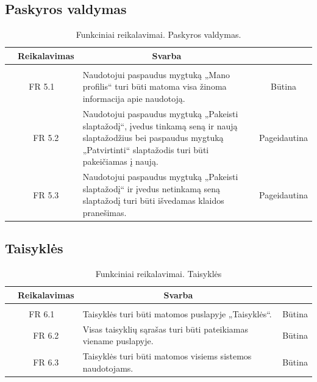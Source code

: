 \documentclass{VUMIFPSkursinis}
\begin{document}
	\subsection{Paskyros valdymas}
	
	\begin{table}[H]
		\caption{Funkciniai reikalavimai. Paskyros valdymas.}
		\begin{tabular}{|p{1cm}|p{1cm}|p{}|p{}|}
			\hline 
			\rowcolor{gray!50}
			\multicolumn{2}{|c|}{{\bfseries Kodas}}&
			\multicolumn{1}{c|}{{\bfseries Reikalavimas}}&
			\multicolumn{1}{c|}{{\bfseries Svarba}}\\
			\hline
			\rowcolor{lightgray}
			\multicolumn{4}{|c|}{Paskyros valdymas}\\				
			\hline
			\multicolumn{2}{|c|}{FR 5.1}&
			{Naudotojui paspaudus mygtuką „Mano profilis“ turi būti matoma visa žinoma informacija apie naudotoją.
			}&		
			\multicolumn{1}{c|}{Būtina}\\
			\hline
			\multicolumn{1}{|c}{}&
			\multicolumn{1}{c|}{FR 5.2}&
			{Naudotojui paspaudus mygtuką „Pakeisti slaptažodį“, įvedus tinkamą seną ir naują slaptažodžius bei paspaudus mygtuką „Patvirtinti“ slaptažodis turi būti pakeičiamas į naują.
			}&		
			\multicolumn{1}{c|}{Pageidautina}\\
			\hline
			\multicolumn{1}{|c}{}&
			\multicolumn{1}{c|}{FR 5.3}&
			{Naudotojui paspaudus mygtuką „Pakeisti slaptažodį“ ir įvedus netinkamą seną slaptažodį turi būti išvedamas klaidos pranešimas.
			}&
			\multicolumn{1}{c|}{Pageidautina}\\	
			\hline		
		\end{tabular}		
	\end{table}
	
	\subsection{Taisyklės}
	\begin{table}[H]
		\caption{Funkciniai reikalavimai. Taisyklės}
		\begin{tabular}{|p{1cm}|p{1cm}|p{}|p{}|}
			\hline 
			\rowcolor{gray!50}
			\multicolumn{2}{|c|}{{\bfseries Kodas}}&
			\multicolumn{1}{c|}{{\bfseries Reikalavimas}}&
			\multicolumn{1}{c|}{{\bfseries Svarba}}\\
			\hline
			\rowcolor{lightgray}
			\multicolumn{4}{|c|}{Taisyklės}\\		
			
			\hline
			\multicolumn{2}{|c|}{FR 6.1}&
			{Taisyklės turi būti matomos puslapyje „Taisyklės“.
			}&		
			\multicolumn{1}{c|}{Būtina}\\
			\hline
			\multicolumn{1}{|c}{}&
			\multicolumn{1}{c|}{FR 6.2}&
			{Visas taisyklių sąrašas turi būti pateikiamas viename puslapyje.
			}&		
			\multicolumn{1}{c|}{Būtina}\\
			\hline	
			\multicolumn{1}{|c}{}&
			\multicolumn{1}{c|}{FR 6.3}&
			{Taisyklės turi būti matomos visiems sistemos naudotojams.
			}&
			\multicolumn{1}{c|}{Būtina}\\									
			\hline
		\end{tabular}		
	\end{table}
	
\end{document}
